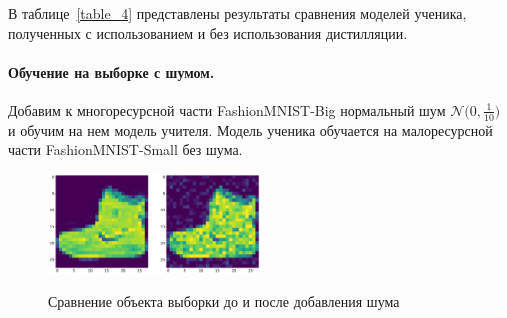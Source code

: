 \begin{table}[h!t]
\begin{center}
\caption{Качество моделей}
\label{table_4}
\end{center}
\end{table}

В таблице~\ref{table_4} представлены результаты сравнения моделей ученика, полученных с использованием и без использования дистилляции.

\newpage
\paragraph{Обучение на выборке с шумом.}
Добавим к многоресурсной части FashionMNIST-Big нормальный шум $\mathcal{N}\bigr(0,\frac{1}{10}\bigr)$ и обучим на нем модель учителя. Модель ученика обучается на малоресурсной части FashionMNIST-Small без шума.

\begin{figure}[h!t]\center
{\includegraphics[width=0.5\textwidth]{results/noise}}
\caption{Сравнение объекта выборки до и после добавления шума}
\end{figure}

